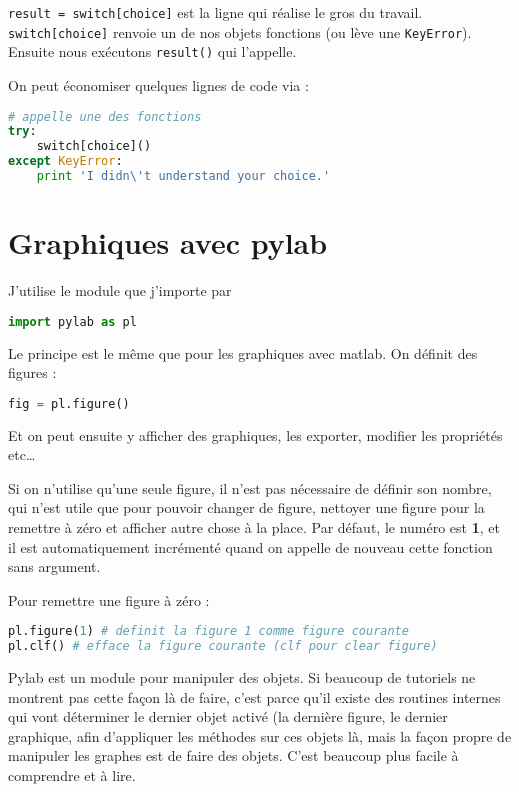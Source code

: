 \documentclass[a4paper,twoside]{article}
\begin{document}
\verb|result = switch[choice]| est la ligne qui réalise le gros du travail. \verb|switch[choice]| renvoie un de nos objets fonctions (ou lève une \verb|KeyError|). Ensuite nous exécutons \verb|result()| qui l’appelle.

On peut économiser quelques lignes de code via :
\begin{lstlisting}[language=python]
# appelle une des fonctions
try:
    switch[choice]()
except KeyError:
    print 'I didn\'t understand your choice.'
\end{lstlisting}



\section{Graphiques avec pylab}
J'utilise le module  que j'importe par
\begin{lstlisting}[language=python]
import pylab as pl
\end{lstlisting}

Le principe est le même que pour les graphiques avec matlab. On définit des figures :
\begin{lstlisting}[language=python]
fig = pl.figure()
\end{lstlisting}
Et on peut ensuite y afficher des graphiques, les exporter, modifier les propriétés etc\dots

\begin{remarque}
Si on n'utilise qu'une seule figure, il n'est pas nécessaire de définir son nombre, qui n'est utile que pour pouvoir changer de figure, nettoyer une figure pour la remettre à zéro et afficher autre chose à la place. Par défaut, le numéro est \textbf{1}, et il est automatiquement incrémenté quand on appelle de nouveau cette fonction sans argument.
\end{remarque}

Pour remettre une figure à zéro :
\begin{lstlisting}[language=python]
pl.figure(1) # definit la figure 1 comme figure courante
pl.clf() # efface la figure courante (clf pour clear figure)
\end{lstlisting}

\begin{attention}
Pylab est un module pour manipuler des objets. Si beaucoup de tutoriels ne montrent pas cette façon là de faire, c'est parce qu'il existe des routines internes qui vont déterminer le dernier objet activé (la dernière figure, le dernier graphique, afin d'appliquer les méthodes sur ces objets là, mais la façon propre de manipuler les graphes est de faire des objets. C'est beaucoup plus facile à comprendre et à lire.
\end{attention}
\end{document}
